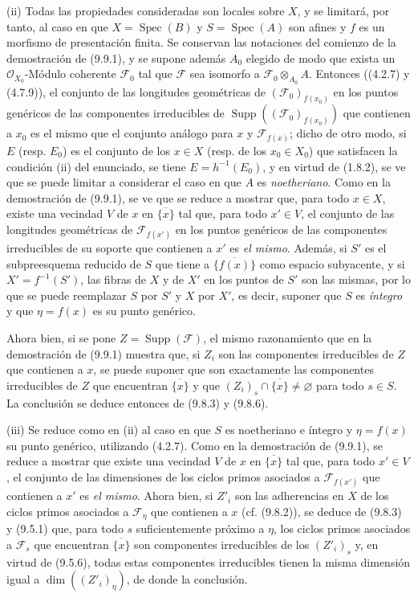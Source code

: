 (ii) Todas las propiedades consideradas son locales sobre $X$, y se limitará,
por tanto, al caso en que $X=\operatorname{Spec}(B)$ y $S=\operatorname{Spec}(A)$ son
afines y $f$ es un morfismo de presentación finita. Se conservan las notaciones del
comienzo de la demostración de (9.9.1), y se supone además $A_0$ elegido de
modo que exista un $\mathcal O_{X_0}$-Módulo coherente $\mathcal F_0$ tal que
$\mathcal F$ sea isomorfo a $\mathcal F_0\otimes_{A_0}A$. Entonces ((4.2.7) y
(4.7.9)), el conjunto de las longitudes geométricas de
$(\mathcal F_0)_{f(x_0)}$ en los puntos genéricos de las componentes irreducibles de
$\operatorname{Supp}((\mathcal F_0)_{f(x_0)})$ que contienen a $x_0$ es el
mismo que el conjunto análogo para $x$ y $\mathcal F_{f(x)}$; dicho de otro modo,
si $E$ (resp. $E_0$) es el conjunto de los $x\in X$ (resp. de los $x_0\in X_0$)
que satisfacen la condición (ii) del enunciado, se tiene $E=h^{-1}(E_0)$, y en virtud de
(1.8.2), se ve que se puede limitar a considerar el caso en que $A$ es
\emph{noetheriano}. Como en la demostración de (9.9.1), se ve que se
reduce a mostrar que, para todo $x\in X$, existe una vecindad $V$ de $x$
en $\overline{\{x\}}$ tal que, para todo $x'\in V$, el conjunto de las longitudes
geométricas de $\mathcal F_{f(x')}$ en los puntos genéricos de las componentes
irreducibles de su soporte que contienen a $x'$ es \emph{el mismo}. Además, si
$S'$ es el subpreesquema reducido de $S$ que tiene a $\overline{\{f(x)\}}$ como espacio
subyacente, y si $X'=f^{-1}(S')$, las fibras de $X$ y de $X'$ en los puntos de
$S'$ son las mismas,
por lo que se puede reemplazar $S$ por $S'$ y $X$ por $X'$, es decir, suponer que
$S$ es \emph{íntegro} y que $\eta=f(x)$ es su punto genérico.

Ahora bien, si se pone $Z=\operatorname{Supp}(\mathcal F)$, el mismo razonamiento que
en la demostración de (9.9.1) muestra que, si $Z_i$ son las componentes
irreducibles de $Z$ que contienen a $x$, se puede suponer que son exactamente las
componentes irreducibles de $Z$ que encuentran $\overline{\{x\}}$ y que
$(Z_i)_s\cap\overline{\{x\}}\neq\varnothing$ para todo $s\in S$. La conclusión
se deduce entonces de (9.8.3) y (9.8.6).

(iii) Se reduce como en (ii) al caso en que $S$ es noetheriano e íntegro y
$\eta=f(x)$ su punto genérico, utilizando (4.2.7). Como en la
demostración de (9.9.1), se reduce a mostrar que existe una vecindad $V$
de $x$ en $\overline{\{x\}}$ tal que, para todo $x'\in V$, el conjunto de las
dimensiones de los ciclos primos asociados a $\mathcal F_{f(x')}$ que contienen a
$x'$ es \emph{el mismo}. Ahora bien, si $Z'_i$ son las adherencias en $X$ de los ciclos
primos asociados a $\mathcal F_\eta$ que contienen a $x$ (cf. (9.8.2)), se
deduce de (9.8.3) y (9.5.1) que, para todo $s$ suficientemente próximo a $\eta$, los
ciclos primos asociados a $\mathcal F_s$ que encuentran
$\overline{\{x\}}$ son componentes irreducibles de los $(Z'_i)_s$ y, en
virtud de (9.5.6), todas estas componentes irreducibles tienen la misma dimensión igual
a $\dim((Z'_i)_\eta)$, de donde la conclusión.

